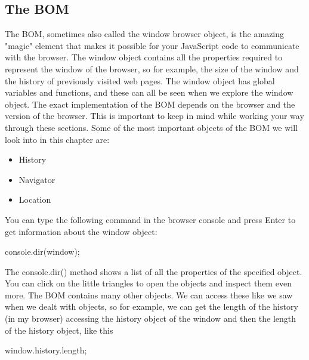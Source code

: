 \documentclass{report}
\begin{document}
    \pagebreak 
    \bigbreak \noindent 
    \subsection{The BOM}
    \bigbreak \noindent 
    The BOM, sometimes also called the window browser object, is the amazing "magic"
    element that makes it possible for your JavaScript code to communicate with the
    browser.
    \bigbreak \noindent 
    The window object contains all the properties required to represent the window of
    the browser, so for example, the size of the window and the history of previously
    visited web pages. The window object has global variables and functions, and these
    can all be seen when we explore the window object. The exact implementation of the
    BOM depends on the browser and the version of the browser. This is important to
    keep in mind while working your way through these sections.
    \bigbreak \noindent 
    Some of the most important objects of the BOM we will look into in this chapter are:
    \begin{itemize}
        \item History
        \item Navigator
        \item Location
    \end{itemize}
    \bigbreak \noindent 
    You can type the following command in the browser console and press Enter to get information about the window object:
    \bigbreak \noindent 
    \begin{jscode}
        console.dir(window);
    \end{jscode}
    \bigbreak \noindent 
    The console.dir() method shows a list of all the properties of the specified object.
    You can click on the little triangles to open the objects and inspect them even more.
    \bigbreak \noindent 
    The BOM contains many other objects. We can access these like we saw when
    we dealt with objects, so for example, we can get the length of the history (in my
    browser) accessing the history object of the window and then the length of the
    history object, like this
    \bigbreak \noindent 
    \begin{jscode}
        window.history.length;
    \end{jscode}

    \bigbreak \noindent 
\end{document}
